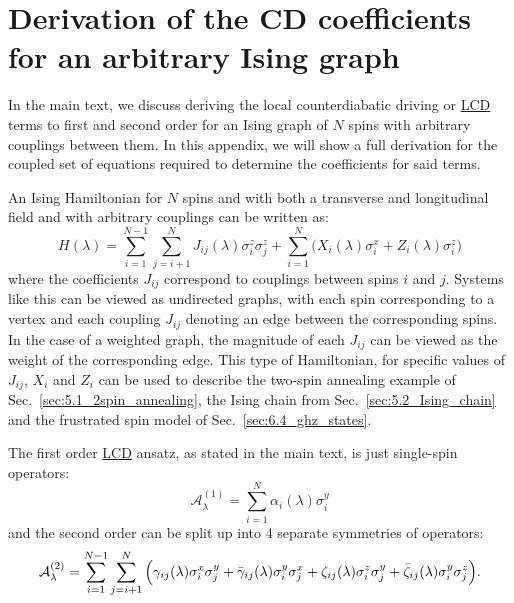 \documentclass[a4paper,oneside,11pt]{book}
\newcommand{\sx}{\sigma^x}
\newcommand{\sy}{\sigma^y}
\newcommand{\sz}{\sigma^z}
\newcommand{\AGP}[1]{\mathcal{A}_{#1}}
\newcommand{\acrref}[1]{\hyperref[acr:#1]{#1}}
\begin{document}
\chapter{Derivation of the CD coefficients for an arbitrary Ising graph}\label{app:arbitrary_ising_derivation}

In the main text, we discuss deriving the local counterdiabatic driving or \acrref{LCD} terms to first and second order for an Ising graph of $N$ spins with arbitrary couplings between them. In this appendix, we will show a full derivation for the coupled set of equations required to determine the coefficients for said terms.

An Ising Hamiltonian for $N$ spins and with both a transverse and longitudinal field and with arbitrary couplings can be written as:
\begin{equation}\label{eq:ising_hamiltonian}
    H(\lambda) = \sum_{i = 1}^{N-1}\sum_{j = i+1}^{N} J_{ij}(\lambda) \sz_i \sz_j + \sum_{i = 1}^{N} \Big( X_i(\lambda) \sx_i + Z_i(\lambda) \sz_i \Big)
\end{equation}
where the coefficients $J_{ij}$ correspond to couplings between spins $i$ and $j$. Systems like this can be viewed as undirected graphs, with each spin corresponding to a vertex and each coupling $J_{ij}$ denoting an edge between the corresponding spins. In the case of a weighted graph, the magnitude of each $J_{ij}$ can be viewed as the weight of the corresponding edge. This type of Hamiltonian, for specific values of $J_{ij}$, $X_i$ and $Z_i$ can be used to describe the two-spin annealing example of Sec.~\ref{sec:5.1_2spin_annealing}, the Ising chain from Sec.~\ref{sec:5.2_Ising_chain} and the frustrated spin model of Sec.~\ref{sec:6.4_ghz_states}. 

The first order \acrref{LCD} ansatz, as stated in the main text, is just single-spin operators:
\begin{equation}\label{eq:spin_agp_1storder}
    \AGP{\lambda}^{(1)} = \sum_{i = 1}^N \alpha_i(\lambda) \sy_i
\end{equation}
and the second order can be split up into 4 separate symmetries of operators:
\begin{equation}\label{eq:spin_agp_2ndorder}
        \AGP{\lambda}^{(2)} = \sum_{i = 1}^{N-1}\sum_{j = i+1}^{N} \Big( \gamma_{ij}(\lambda) \sx_i \sy_j + \Bar{\gamma}_{ij}(\lambda) \sy_i \sx_j + \zeta_{ij}(\lambda) \sz_i \sy_j + \Bar{\zeta}_{ij}(\lambda) \sy_i \sz_j \Big).
\end{equation}
\end{document}
